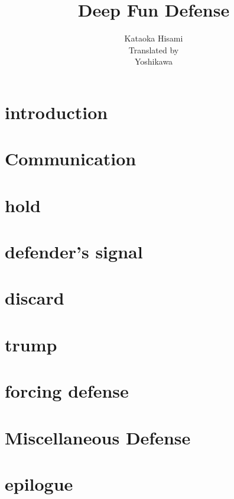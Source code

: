 \documentclass[twocolumn]{book}
\newlength{\br}
\begin{document}
\title{Deep Fun Defense
 }
\author{Kataoka Hisami\\
Translated by\\
Yoshikawa\\
\date{}}
\maketitle
\chapter*{introduction}

\tableofcontents


\chapter {Communication}

\chapter{hold}%

\chapter{defender's signal}


\chapter{discard}

\chapter{trump}



\chapter{forcing defense}

\chapter{Miscellaneous Defense}

\chapter*{epilogue}

%
\printindex
\end{document}
